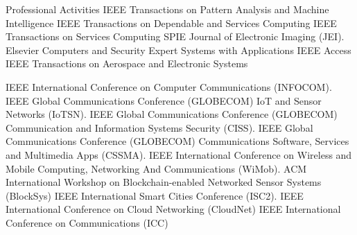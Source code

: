 \begin{rubric}{Professional Activities}
\entry*[]
IEEE Transactions on Pattern Analysis and Machine Intelligence
\entry*[]
IEEE Transactions on Dependable and Services Computing
\entry*[]
IEEE Transactions on Services Computing
\entry*[]
SPIE Journal of Electronic Imaging (JEI).
%
\entry*[]
Elsevier Computers and Security
\entry*[]
Expert Systems with Applications
\entry*[]
IEEE Access
%
\entry*[]
IEEE Transactions on Aerospace and Electronic Systems

%
\entry*[]
IEEE International Conference on Computer Communications (INFOCOM).
%
\entry*[]
IEEE Global Communications Conference (GLOBECOM) IoT and Sensor Networks (IoTSN).
%
\entry*[]
IEEE Global Communications Conference (GLOBECOM) Communication and Information Systems Security (CISS).
%
\entry*[]
IEEE Global Communications Conference (GLOBECOM) Communications Software, Services and Multimedia Apps (CSSMA).
%
\entry*[]
IEEE International Conference on Wireless and Mobile Computing, Networking And Communications
(WiMob).
%
\entry*[]
ACM International Workshop on Blockchain-enabled Networked Sensor Systems (BlockSys)
%
\entry*[] 
IEEE International Smart Cities Conference (ISC2).
%
\entry*[] 
IEEE International Conference on Cloud Networking (CloudNet)
%
\entry*[] 
IEEE International Conference on Communications (ICC)
%
\end{rubric}